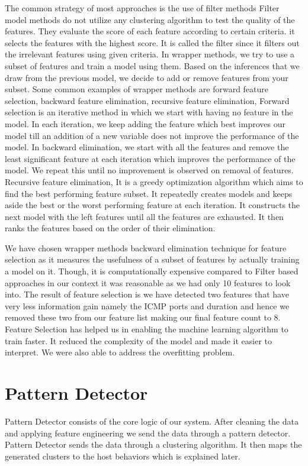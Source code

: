 	The common strategy of most approaches is the use of filter methods Filter model methods do not utilize any clustering algorithm to test the quality of the features. They evaluate the score of each feature according to certain criteria\cite{dash2002feature}. it selects the features with the highest score. It is called the filter since it filters out the irrelevant features using given criteria. In wrapper methods, we try to use a subset of features and train a model using them. Based on the inferences that we draw from the previous model, we decide to add or remove features from your subset. Some common examples of wrapper methods are forward feature selection, backward feature elimination, recursive feature elimination, Forward selection is an iterative method in which we start with having no feature in the model. In each iteration, we keep adding the feature which best improves our model till an addition of a new variable does not improve the performance of the model. In backward elimination, we start with all the features and remove the least significant feature at each iteration which improves the performance of the model. We repeat this until no improvement is observed on removal of features. Recursive feature elimination, It is a greedy optimization algorithm which aims to find the best performing feature subset. It repeatedly creates models and keeps aside the best or the worst performing feature at each iteration. It constructs the next model with the left features until all the features are exhausted. It then ranks the features based on the order of their elimination.
	
	We have chosen wrapper methods backward elimination technique for feature selection as it measures the usefulness of a subset of features by actually training a model on it. Though, it is computationally expensive compared to Filter based approaches in our context it was reasonable as we had only 10 features to look into. The result of feature selection is we have detected two features that have very less information gain namely the ICMP ports and duration and hence we removed these two from our feature list making our final feature count to 8.
	 Feature Selection has helped us in enabling the machine learning algorithm to train faster. It reduced the complexity of the model and made it easier to interpret. We were also able to address the overfitting problem.






\section{Pattern Detector}
Pattern Detector consists of the core logic of our system. After cleaning the data and applying feature engineering we send the data through a pattern detector. Pattern Detector sends the data through a clustering algorithm. It then maps the generated clusters to the host behaviors which is explained later.

